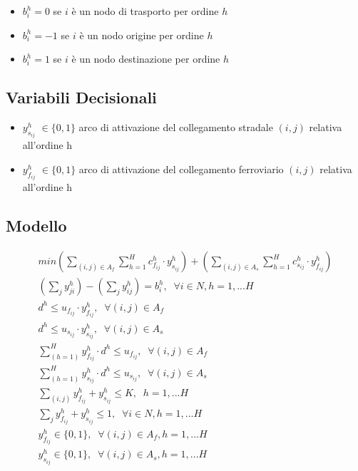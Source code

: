 \documentclass{article}
\begin{document}
\begin{itemize}
    \item $b_i^h = 0$ se $i$ è un nodo di trasporto per ordine $h$
    \item  $b_i^h =-1$ se $i$ è un nodo origine per ordine $h$
    \item $b_i^h =1$ se $i$ è un nodo destinazione per ordine $h$
\end{itemize}

\subsection{Variabili Decisionali}
\begin{itemize}
    \item $y_{s_{ij}}^h$ $\in \{0,1\}$ arco di attivazione del collegamento stradale $(i,j)$ relativa all'ordine h
    \item $y_{f_{ij}}^h$ $\in \{0,1\}$ arco di attivazione del collegamento ferroviario $(i,j)$ relativa all'ordine h
\end{itemize}

\subsection{Modello}

\label{problem1}
\begin{align}
    min (\sum_{(i,j) \in A_f}\sum_{h=1}^H c_{f_{ij}}^h \cdot y_{s_{ij}}^h) +
    (\sum_{(i,j) \in A_s}\sum_{h=1}^H c_{s_{ij}}^h \cdot y_{f_{ij}}^h)
    \label{mod:obj}
    \\
    (\sum_{j}y_{ji}^h)- (\sum_{j}y_{ij}^h ) = b_i^h, \; \; \forall i \in N, h=1, ... H
    \label{mod:v2}
    \\
    d^h \leq u_{f_{ij}} \cdot y_{f_{ij}}^h, \; \; \forall (i,j) \in A_f
    \label{mod:v3}
    \\
    d^h \leq u_{s_{ij}} \cdot y_{s_{ij}}^h, \; \; \forall (i,j) \in A_s
    \label{mod:v4}
    \\
    \sum_{(h=1)}^H y_{f_{ij}}^h \cdot d^h \leq u_{f_{ij}}, \; \; \forall (i,j) \in A_f
    \label{mod:v5}
    \\
    \sum_{(h=1)}^H y_{s_{ij}}^h \cdot d^h \leq u_{s_{ij}}, \; \; \forall (i,j) \in A_s
    \label{mod:v6}
    \\
    \sum_{(i,j)} y_{f_{ij}}^h + y_{s_{ij}}^h \leq K, \; \; h=1, ... H
    \label{mod:v7}
    \\
    \sum_{j} y_{f_{ij}}^h + y_{s_{ij}}^h \leq 1, \; \; \forall i \in \textit{N} , h=1, ... H
    \label{mod:v8}
    \\
     y_{f_{ij}}^h \in \{0,1\}, \; \; \forall (i,j) \in A_f, h=1, ... H
    \label{mod:v9}
    \\
    y_{s_{ij}}^h \in \{0,1\}, \; \; \forall (i,j) \in A_s, h=1, ... H
    \label{mod:v10}
\end{align}
\end{document}
